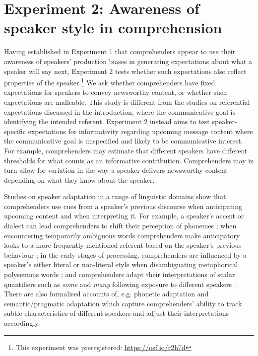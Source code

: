 \documentclass[output=paper,colorlinks,citecolor=brown]{langscibook}
\begin{document}
\section{Experiment 2: Awareness of speaker style in comprehension}\largerpage

Having established in Experiment 1 that comprehenders appear to use their awareness of speakers' production biases in generating expectations about what a speaker will say next, Experiment 2 tests whether such expectations also reflect properties of the speaker.\footnote{This experiment was preregistered: \url{https://osf.io/r2h7d}} We ask whether comprehenders have fixed expectations for speakers to convey newsworthy content, or whether such expectations are malleable. This study is different from the studies on referential expectations discussed in the introduction, where the communicative goal is identifying the intended referent. Experiment 2 instead aims to test speaker-specific expectations for informativity regarding upcoming message content where the communicative goal is unspecified and likely to be communicative interest. For example, comprehenders may estimate that different speakers have different thresholds for what counts as an informative contribution. Comprehenders may in turn allow for variation in the way a speaker delivers newsworthy content depending on what they know about the speaker. 

Studies on speaker adaptation in a range of linguistic domains show that comprehenders use cues from a speaker’s previous discourse when anticipating upcoming content and when interpreting it. For example, a speaker’s accent or dialect can lead comprehenders to shift their perception of phonemes \citep{HayEtAl2006,HayDrager2010}; when encountering temporarily ambiguous words comprehenders make anticipatory looks to a more frequently mentioned referent based on the speaker’s previous behaviour \citep{CreelTanenhaus2008}; in the early stages of processing, comprehenders are influenced by a speaker’s either literal or non-literal style when disambiguating metaphorical polysemous words \citep{DaviesEtAl2022}; and comprehenders adapt their interpretations of scalar quantifiers such as \textit{some} and \textit{many} following exposure to different speakers \citep{YildirimJaeger2016}. There are also formalised accounts of, e.g. phonetic adaptation \citep{KleinschmidtJaeger2015} and semantic/pragmatic adaptation \citep{SchusterDegen2020} which capture comprehenders' ability to track subtle characteristics of different speakers and adjust their interpretations accordingly. 
 
\end{document}
